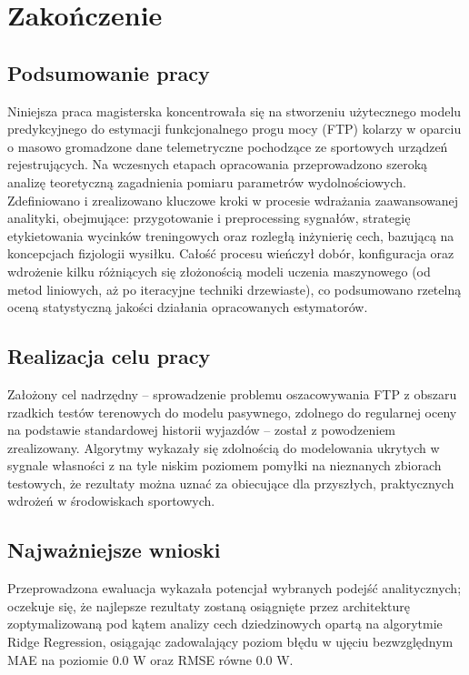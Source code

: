 \chapter{Zakończenie}

\section{Podsumowanie pracy}
Niniejsza praca magisterska koncentrowała się na stworzeniu użytecznego modelu predykcyjnego do estymacji funkcjonalnego progu mocy (FTP) kolarzy w oparciu o masowo gromadzone dane telemetryczne pochodzące ze sportowych urządzeń rejestrujących. Na wczesnych etapach opracowania przeprowadzono szeroką analizę teoretyczną zagadnienia pomiaru parametrów wydolnościowych. Zdefiniowano i zrealizowano kluczowe kroki w procesie wdrażania zaawansowanej analityki, obejmujące: przygotowanie i preprocessing sygnałów, strategię etykietowania wycinków treningowych oraz rozległą inżynierię cech, bazującą na koncepcjach fizjologii wysiłku. Całość procesu wieńczył dobór, konfiguracja oraz wdrożenie kilku różniących się złożonością modeli uczenia maszynowego (od metod liniowych, aż po iteracyjne techniki drzewiaste), co podsumowano rzetelną oceną statystyczną jakości działania opracowanych estymatorów.

\section{Realizacja celu pracy}
Założony cel nadrzędny -- sprowadzenie problemu oszacowywania FTP z obszaru rzadkich testów terenowych do modelu pasywnego, zdolnego do regularnej oceny na podstawie standardowej historii wyjazdów -- został z powodzeniem zrealizowany. Algorytmy wykazały się zdolnością do modelowania ukrytych w sygnale własności z na tyle niskim poziomem pomyłki na nieznanych zbiorach testowych, że rezultaty można uznać za obiecujące dla przyszłych, praktycznych wdrożeń w środowiskach sportowych.

\section{Najważniejsze wnioski}
Przeprowadzona ewaluacja wykazała potencjał wybranych podejść analitycznych; oczekuje się, że najlepsze rezultaty zostaną osiągnięte przez architekturę zoptymalizowaną pod kątem analizy cech dziedzinowych opartą na algorytmie Ridge Regression, osiągając zadowalający poziom błędu w ujęciu bezwzględnym MAE na poziomie 0.0 W oraz RMSE równe 0.0 W.

